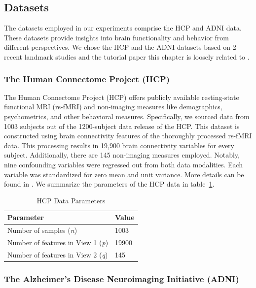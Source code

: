 \subsection{Datasets}\label{subsec:datasets}

The datasets employed in our experiments comprise the HCP and ADNI data.
These datasets provide insights into brain functionality and behavior from different perspectives.
We chose the HCP and the ADNI datasets based on 2 recent landmark studies and the tutorial paper this chapter is loosely related to \cite{mihalik2022canonical}.

\subsubsection{The Human Connectome Project (HCP)}

The Human Connectome Project (HCP) offers publicly available resting-state functional MRI (rs-fMRI) and non-imaging measures like demographics, psychometrics, and other behavioral measures.
Specifically, we sourced data from 1003 subjects out of the 1200-subject data release of the HCP.
This dataset is constructed using brain connectivity features of the thoroughly processed rs-fMRI data.
This processing results in 19,900 brain connectivity variables for every subject.
Additionally, there are 145 non-imaging measures employed.
Notably, nine confounding variables were regressed out from both data modalities.
Each variable was standardized for zero mean and unit variance.
More details can be found in \cite{smith2015positive, mihalik2022canonical}.
We summarize the parameters of the HCP data in table~\ref{tab:hcp-parameters}.

\begin{table}
\centering
\caption{HCP Data Parameters}
\begin{tabular}{| l | l |}
\hline
\textbf{Parameter} & \textbf{Value} \\
\hline
Number of samples (\textit{n}) & 1003 \\
Number of features in View 1 (\textit{p}) & 19900 \\
Number of features in View 2 (\textit{q}) & 145 \\
\hline
\end{tabular}\label{tab:hcp-parameters}
\end{table}

\subsubsection{The Alzheimer's Disease Neuroimaging Initiative (ADNI)}

